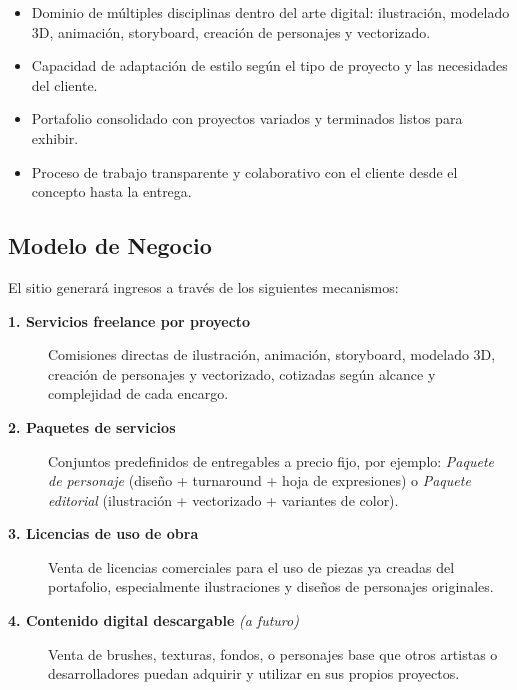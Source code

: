 \documentclass[12pt, letterpaper]{article}
\begin{document}
\begin{itemize}
  \item Dominio de múltiples disciplinas dentro del arte digital: ilustración, modelado 3D, animación, storyboard, creación de personajes y vectorizado.
  \item Capacidad de adaptación de estilo según el tipo de proyecto y las necesidades del cliente.
  \item Portafolio consolidado con proyectos variados y terminados listos para exhibir.
  \item Proceso de trabajo transparente y colaborativo con el cliente desde el concepto hasta la entrega.
\end{itemize}

\subsection{Modelo de Negocio}

El sitio generará ingresos a través de los siguientes mecanismos:

\begin{description}
  \item[\textbf{\color{luluPurple}1. Servicios freelance por proyecto}]
  Comisiones directas de ilustración, animación, storyboard, modelado 3D, creación de personajes y vectorizado, cotizadas según alcance y complejidad de cada encargo.

  \item[\textbf{\color{luluPurple}2. Paquetes de servicios}]
  Conjuntos predefinidos de entregables a precio fijo, por ejemplo: \textit{Paquete de personaje} (diseño + turnaround + hoja de expresiones) o \textit{Paquete editorial} (ilustración + vectorizado + variantes de color).

  \item[\textbf{\color{luluPurple}3. Licencias de uso de obra}]
  Venta de licencias comerciales para el uso de piezas ya creadas del portafolio, especialmente ilustraciones y diseños de personajes originales.

  \item[\textbf{\color{luluPurple}4. Contenido digital descargable} \normalfont\itshape (a futuro)]
  Venta de brushes, texturas, fondos, o personajes base que otros artistas o desarrolladores puedan adquirir y utilizar en sus propios proyectos.
\end{description}


\end{document}
